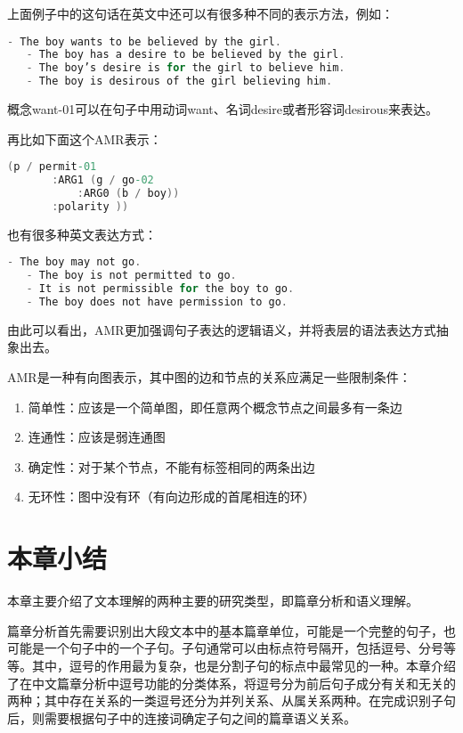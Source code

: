 \documentclass[master, winfont]{njuthesis}
\begin{document}
上面例子中的这句话在英文中还可以有很多种不同的表示方法，例如：
\begin{lstlisting}[language=C]
   - The boy wants to be believed by the girl.
   - The boy has a desire to be believed by the girl.
   - The boy’s desire is for the girl to believe him.
   - The boy is desirous of the girl believing him.
\end{lstlisting}

概念want-01可以在句子中用动词want、名词desire或者形容词desirous来表达。

再比如下面这个AMR表示：
\begin{lstlisting}[language=C]
   (p / permit-01
       :ARG1 (g / go-02
           :ARG0 (b / boy))
       :polarity ))
\end{lstlisting}

也有很多种英文表达方式：
\begin{lstlisting}[language=C]
   - The boy may not go.
   - The boy is not permitted to go.
   - It is not permissible for the boy to go.
   - The boy does not have permission to go.
\end{lstlisting}

由此可以看出，AMR更加强调句子表达的逻辑语义，并将表层的语法表达方式抽象出去。

AMR是一种有向图表示，其中图的边和节点的关系应满足一些限制条件\cite{Flanigan2014}：
\begin{enumerate}
  \item 简单性：应该是一个简单图，即任意两个概念节点之间最多有一条边
  \item 连通性：应该是弱连通图
  \item 确定性：对于某个节点，不能有标签相同的两条出边
  \item 无环性：图中没有环（有向边形成的首尾相连的环）
\end{enumerate}

\section{本章小结}
本章主要介绍了文本理解的两种主要的研究类型，即篇章分析和语义理解。

篇章分析首先需要识别出大段文本中的基本篇章单位，可能是一个完整的句子，也可能是一个句子中的一个子句。子句通常可以由标点符号隔开，包括逗号、分号等等。其中，逗号的作用最为复杂，也是分割子句的标点中最常见的一种。本章介绍了在中文篇章分析中逗号功能的分类体系，将逗号分为前后句子成分有关和无关的两种；其中存在关系的一类逗号还分为并列关系、从属关系两种。在完成识别子句后，则需要根据句子中的连接词确定子句之间的篇章语义关系。
\end{document}
